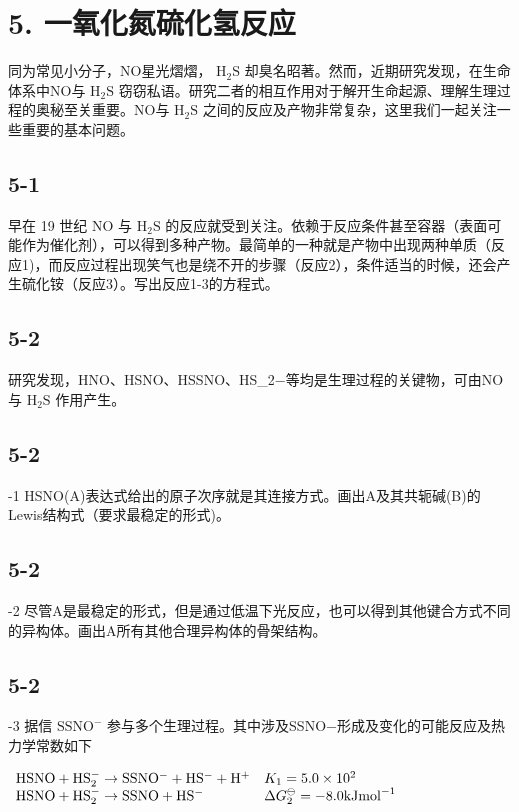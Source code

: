\section*{5. 一氧化氮硫化氢反应}
同为常⻅⼩分⼦，NO星光熠熠， $\mathrm { H } _ { 2 } \mathrm { S }$ 却臭名昭著。然⽽，近期研究发现，在⽣命体系中NO与 $\mathrm { H } _ { 2 } \mathrm { S }$ 窃窃私语。研究⼆者的相互作⽤对于解开⽣命起源、理解⽣理过程的奥秘⾄关重要。NO与 $\mathrm { H } _ { 2 } \mathrm { S }$ 之间的反应及产物⾮常复杂，这⾥我们⼀起关注⼀些重要的基本问题。

\subsection*{5-1}
早在 19 世纪 NO 与 $\mathrm { H } _ { 2 } \mathrm { S }$ 的反应就受到关注。依赖于反应条件甚⾄容器（表⾯可能作为催化剂），可以得到多种产物。最简单的⼀种就是产物中出现两种单质（反应1)，⽽反应过程出现笑⽓也是绕不开的步骤（反应2），条件适当的时候，还会产⽣硫化铵（反应3）。写出反应1-3的⽅程式。

\subsection*{5-2}
研究发现，HNO、HSNO、HSSNO、HS_{2}−等均是⽣理过程的关键物，可由NO与 $\mathrm { H } _ { 2 } \mathrm { S }$ 作⽤产⽣。

\subsection*{5-2}
-1 HSNO(A)表达式给出的原⼦次序就是其连接⽅式。画出A及其共轭碱(B)的Lewis结构式（要求最稳定的形式)。

\subsection*{5-2}
-2 尽管A是最稳定的形式，但是通过低温下光反应，也可以得到其他键合⽅式不同的异构体。画出A所有其他合理异构体的⻣架结构。

\subsection*{5-2}
-3 据信 $\mathrm { S S N O ^ { - } }$ 参与多个⽣理过程。其中涉及SSNO−形成及变化的可能反应及热⼒学常数如下

$
\begin{array}{l l}\mathrm {HSNO + HS_ {2} ^ {-} \rightarrow SSNO^ {-} + HS^ {-} + H^ {+}}&K _ {1} = 5. 0 \times 1 0 ^ {2}\\\mathrm {HSNO + HS_ {2} ^ {-} \rightarrow SSNO + HS^ {-}}&\Delta G _ {2} ^ {\ominus} = - 8. 0 \mathrm{kJmol} ^ {- 1}\end{array}
$

